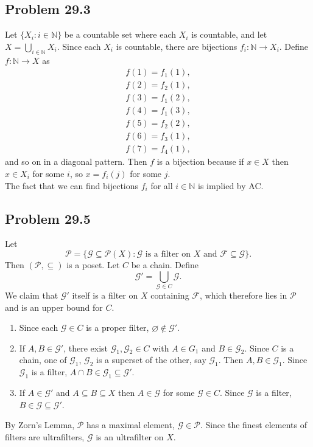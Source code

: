 \documentclass{article}
\newcommand{\N}{\mathbb{N}}
\newcommand{\power}{\mathcal{P}}
\newcommand{\F}{\mathcal{F}}
\newcommand{\G}{\mathcal{G}}
\newcommand{\nullset}{\varnothing}
\begin{document}
\subsection*{Problem 29.3}
Let $\{X_i : i \in \N\}$ be a countable set where each $X_i$ is countable, and let $X = \bigcup_{i \in \N} X_i$. Since each $X_i$ is countable, there are bijections $f_i: \N\to X_i$. Define $f: \N \to X$ as
\begin{align*}
    f(1) = f_1(1),\\
    f(2) = f_2(1),\\
    f(3) = f_1(2),\\
    f(4) = f_1(3),\\
    f(5) = f_2(2),\\
    f(6) = f_3(1),\\
    f(7) = f_4(1),
\end{align*}
and so on in a diagonal pattern. Then $f$ is a bijection because if $x \in X$ then $x \in X_i$ for some $i$, so $x = f_i(j)$ for some $j$. \\

The fact that we can find bijections $f_i$ for all $i \in \N$ is implied by AC.

\subsection*{Problem 29.5}
Let
$$\power = \{\G \subseteq \power(X): \G \text{ is a filter on } X \text{ and } \F \subseteq \G\}.$$
Then $(\power, \subseteq)$ is a poset. Let $C$ be a chain. Define
$$\G' = \bigcup_{\G \in C} \G.$$
We claim that $\G'$ itself is a filter on $X$ containing $\F$, which therefore lies in $\power$ and is an upper bound for $C$.
\begin{enumerate}
    \item Since each $\G \in C$ is a proper filter, $\nullset \notin \G'$.
    \item If $A, B \in \G'$, there exist $\G_1, \G_2 \in C$ with $A \in G_1$ and $B \in \G_2$. Since $C$ is a chain, one of $\G_1$, $\G_2$ is a superset of the other, say $\G_1$. Then $A, B \in \G_1$. Since $\G_1$ is a filter, $A \cap B \in \G_1 \subseteq \G'$.
    \item If $A \in \G'$ and $A \subseteq B \subseteq X$ then $A \in \G$ for some $\G \in C$. Since $\G$ is a filter, $B \in \G \subseteq \G'$.
\end{enumerate}
By Zorn's Lemma, $\power$ has a maximal element, $\G \in \power$. Since the finest elements of filters are ultrafilters, $\G$ is an ultrafilter on $X$.
\end{document}
